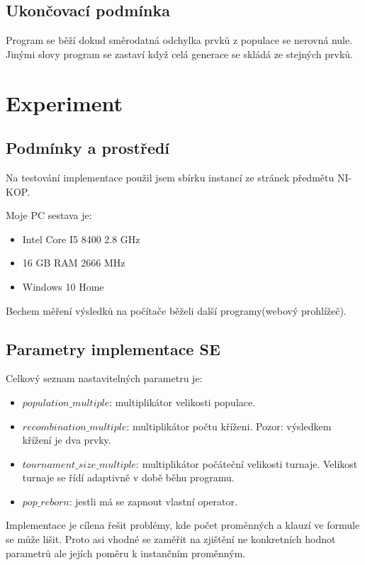 \documentclass{article}
\begin{document}
\subsection{Ukončovací podmínka}

Program se běží dokud směrodatná odchylka prvků z populace se nerovná nule. Jinými slovy program se zastaví když celá generace se skládá ze stejných prvků.        

\newpage
\section{Experiment}
\subsection{Podmínky a prostředí}
Na testování implementace použil jsem sbírku instancí ze stránek předmětu NI-KOP.

Moje PC sestava je:
\begin{itemize}
\item Intel Core I5 8400 2.8 GHz
\item 16 GB RAM 2666 MHz
\item Windows 10 Home
\end{itemize}

Bechem měření výsledků na počítače běželi další programy(webový prohlížeč).

\subsection{Parametry implementace SE}

Celkový seznam nastavitelných parametru je:
\begin{itemize}
\item \(population\_multiple\): multiplikátor velikosti populace.
\item \(recombination\_multiple\): multiplikátor počtu kříženi. Pozor: výsledkem křížení je dva prvky.
\item \(tournament\_size\_multiple\): multiplikátor počáteční velikosti turnaje. Velikost turnaje se řídí adaptivně v době běhu programu.
\item \(pop\_reborn\): jestli má se zapnout vlastní operator.
\end{itemize}

Implementace je cílena řešit problémy, kde počet proměnných a klauzí ve formule se může lišit. Proto asi vhodné se zaměřit na zjištění ne konkretních hodnot parametrů ale jejích poměru k instančním proměnným.\\   
\end{document}
